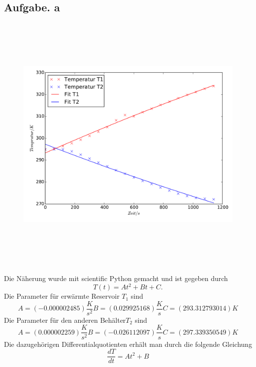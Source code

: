 \begin{table}
\subsection{Aufgabe. a}
\begin{figure}
\includegraphics[height=13cm]{Temperaturgraphik.pdf}
\end{figure}
%  
Die Näherung wurde mit scientific Python gemacht und ist gegeben durch
\begin{equation}
  T(t)=At^2+Bt+C .
\end{equation}
Die Parameter für erwärmte Reservoir $T_1$ sind
\begin{equation}
  A=(  -0.000002485)\frac{K}{s^2}
  B=(   0.029925168)\frac{K}{s}
  C=( 293.312793014)K
\end{equation}
Die Parameter für den anderen Behälter$T_2$ sind
\begin{equation}
  A=(  0.000002259)\frac{K}{s^2}
  B=( -0.026112097)\frac{K}{s}
  C=(297.339350549)K

\end{equation}
Die dazugehörigen Differentialquotienten erhält man durch die folgende Gleichung
\begin{equation}
\frac{dT}{dt}=At^2+B
\end{equation}


\end{table}
